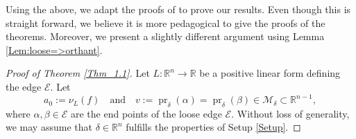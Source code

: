 \documentclass[11pt]{amsart}
\theoremstyle{plain}
\theoremstyle{definition}
\numberwithin{equation}{section}
\newcommand{\pr}{\operatorname{pr}}
\renewcommand{\a}{\alpha}
\renewcommand{\b}{\beta}
\renewcommand{\d}{\delta}
\newcommand{\RR}{\mathbb R}
\newcommand{\cE}{\mathcal{E}}
\newcommand{\cM}{\mathcal{M}}
\renewcommand{\(}{(\!(}
\renewcommand{\)}{)\!)}
\begin{document}
\smallskip

Using the above, we adapt the proofs of \cite{GH} to prove our results.
Even though this is straight forward, we believe it is more pedagogical to give the proofs of the theorems.
Moreover, we present a slightly different argument using Lemma \ref{Lem:loose=>orthant}.

\medskip

\begin{proof}[Proof of Theorem \ref{Thm_1.1}]
	Let $ L : \RR^n \to \RR $ be a positive linear form defining the edge $ \cE $.  
	Let 
	\[ 
		a_0 := \nu_L(f) 
		\ \ \ 
		\mbox{ and }
		\ \ \
		v := \pr_\d (\a) = \pr_\d (\b) \in \cM_\d \subset \RR^{n-1}
		,
	\] 
	where $ \a, \b \in \cE $ are the end points of the loose edge $ \cE $.
	Without loss of generality, we may assume that $ \d \in \RR^n $ fulfills the properties of Setup \ref{Setup}. 
	

\end{proof}
\end{document}
